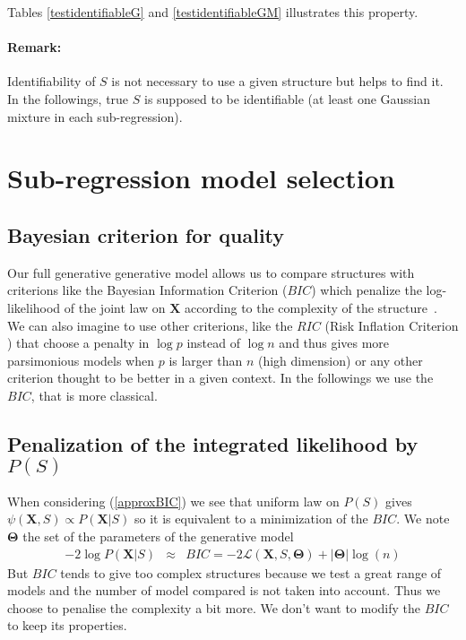 \documentclass[12pt,a4paper]{report}
\begin{document}
	Tables \ref{testidentifiableG}	and \ref{testidentifiableGM} illustrates this property.
	
\paragraph{Remark:} Identifiability of $S$ is not necessary to use a given structure but helps to find it.
In the followings, true $S$ is supposed to be identifiable (at least one Gaussian mixture in each sub-regression).
		

\section{Sub-regression model selection}	

			\subsection{Bayesian criterion for quality}
		Our full generative generative model allows us to compare structures with criterions like the Bayesian Information Criterion ($BIC$) which penalize the log-likelihood of the joint law on $\boldsymbol{X}$ according to the complexity of the structure~\cite{BIChuard}. \\
			 We can also imagine to use other criterions, like the $RIC$ (Risk Inflation Criterion \cite{foster1994risk}) that choose a penalty in $\log p$ instead of $\log n$ and thus gives more parsimonious models when $p$ is larger than $n$ (high dimension) or any other criterion \cite{george1993variable} thought to be better in a given context.
		In the followings we use the $BIC$, that is more classical.
		\subsection{Penalization of the integrated likelihood by $P(S)$} \label{compstruct}
When considering (\ref{approxBIC}) we see that uniform law on $P(S)$ gives $\psi(\boldsymbol{X},S)\propto P(\boldsymbol{X}|S)$ so it is equivalent to a minimization of the $BIC$.
	We note $\boldsymbol{\Theta}$ the set of the parameters of the generative model
	\begin{eqnarray}
		-2\log P(\boldsymbol{X}|S)&\approx & BIC=-2\mathcal{L}(\boldsymbol{X},S,\boldsymbol{\Theta})+|\boldsymbol{\Theta}|\log(n)  
	\end{eqnarray}
	But $BIC$ tends to give too complex structures because we test a great range of models and the number of model compared is not taken into account\cite{massart2007concentration}. Thus we choose to penalise the complexity a bit more. We don't want to modify the $BIC$ to keep its properties.
	
\end{document}
